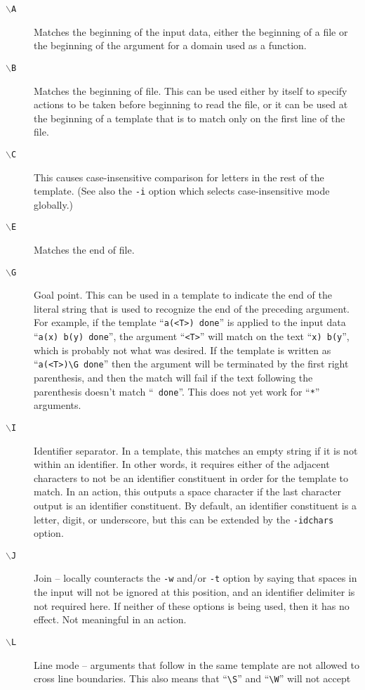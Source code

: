 \begin{description}
\item[{\tt $\backslash$A}]
Matches the beginning of the input data, either the beginning of a file
or the beginning of the argument for a domain used as a function.
\item[{\tt $\backslash$B}]
Matches the beginning of file.
This can be used either by itself to specify actions to be taken before
beginning to read the file, or it can be used at the beginning of a
template that is to match only on the first line of the file.
\item[{\tt $\backslash$C}]
This causes case-insensitive comparison for letters in the rest of the
template.  (See also the \verb/-i/ option which selects case-insensitive
mode globally.)
\item[{\tt $\backslash$E}]
Matches the  end of file.
\item[{\tt $\backslash$G}]
Goal point.
This can be used in a template to indicate the end of the literal string
that is used to recognize the end of the preceding argument.
For example, if the template ``\verb/a(<T>) done/'' is applied to the input
data ``\verb/a(x) b(y) done/'', the argument ``\verb/<T>/'' will match on
the text ``\verb/x) b(y/'', which is probably not what was desired.
If the template is written as ``\verb/a(<T>)\G done/'' then the argument
will be terminated by the first right parenthesis, and then the match will
fail if the text following the parenthesis doesn't match ``\verb/ done/''.
This does not yet work for ``\verb/*/'' arguments.
\item[{\tt $\backslash$I}]
Identifier separator.  In a template, this matches an empty string if it
is not within an identifier.  In other words, it requires either of the
adjacent characters to not be an identifier constituent in order for the
template to match.
In an action, this outputs a space character if the last character
output is an identifier constituent.
By default, an identifier constituent is a letter, digit, or underscore,
but this can be extended by the \verb/-idchars/ option.
\item[{\tt $\backslash$J}]
Join -- locally counteracts the \verb/-w/ and/or \verb/-t/
option by saying that spaces in the input will not be ignored at this
position, and an identifier delimiter is not required here.
If neither of these options is being used, then it has no effect.
Not meaningful in an action.
\item[{\tt $\backslash$L}]
Line mode -- arguments that follow in the same template are not allowed
to cross line boundaries.
This also means that ``\verb/\S/'' and ``\verb/\W/'' will not accept

\end{description}
